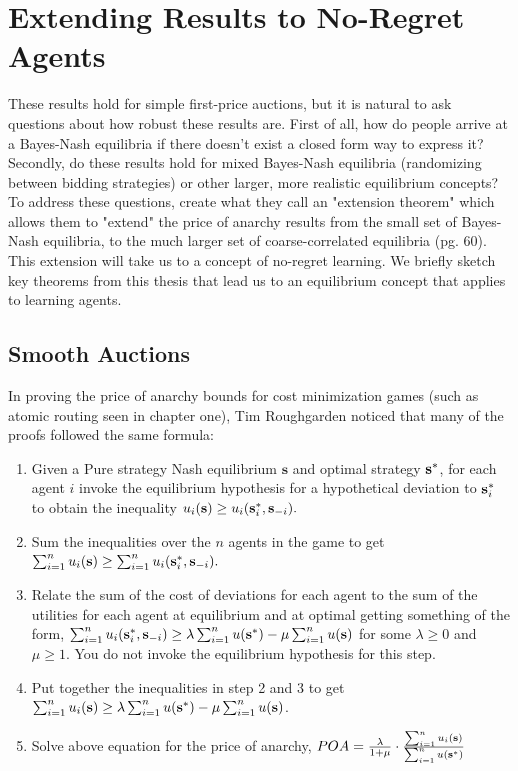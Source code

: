 \documentclass[12pt,twoside]{reedthesis}
\begin{document}
\section{Extending Results to No-Regret Agents}
These results hold for simple first-price auctions, but it is natural to ask questions about how robust these results are. First of all, how do people arrive at a Bayes-Nash equilibria if there doesn't exist a closed form way to express it? Secondly, do these results hold for mixed Bayes-Nash equilibria (randomizing between bidding strategies) or other larger, more realistic equilibrium concepts? To address these questions, \cite{Roughgarden2017} create what they call an "extension theorem" which allows them to "extend" the price of anarchy results from the small set of Bayes-Nash equilibria, to the much larger set of coarse-correlated equilibria (pg. 60).  This extension will take us to a concept of no-regret learning. We briefly sketch key theorems from this thesis that lead us to an equilibrium concept that applies to learning agents.


\subsection{Smooth Auctions}

In proving the price of anarchy bounds for cost minimization games (such as atomic routing seen in chapter one), Tim Roughgarden noticed that many of the proofs followed the same formula:

\begin{enumerate}
	\item Given a Pure strategy Nash equilibrium $\textbf{s}$ and optimal strategy $\textbf{s}^{*}$, for each agent $i$ invoke the equilibrium hypothesis for a hypothetical deviation to $\textbf{s}^*_i$ to obtain the inequality $u_i(\textbf{s}) \geq u_i(\textbf{s}_i^*,\textbf{s}_{-i}).$
	
	\item Sum the inequalities over the $n$ agents in the game to get $\sum_{i=1}^{n}u_i(\textbf{s}) \geq \sum_{i=1}^{n}u_i(\textbf{s}_i^*,\textbf{s}_{-i}).$
	
	
	\item Relate the sum of the cost of deviations for each agent to the sum of the utilities for each agent at equilibrium and at optimal getting something of the form, $\sum_{i=1}^{n}u_i(\textbf{s}_i^*,\textbf{s}_{-i}) \geq \lambda \sum_{i=1}^{n}u(\textbf{s}^*) - \mu \sum_{i=1}^{n}u(\textbf{s})$ for some $\lambda \geq 0$ and $\mu \geq 1$. You do not invoke the equilibrium hypothesis for this step.
	
	\item Put together the inequalities in step 2 and 3 to get $\sum_{i=1}^{n}u_i(\textbf{s}) \geq \lambda \sum_{i=1}^{n}u(\textbf{s}^*) - \mu \sum_{i=1}^{n}u(\textbf{s})$.
	
	\item Solve above equation for the price of anarchy, $POA =  \frac{\lambda}{1 + \mu} \cdot \frac{\sum_{i=1}^{n}u_i(\textbf{s})}{\sum_{i=1}^{n}u(\textbf{s}^*)}$
\end{enumerate}
\end{document}
